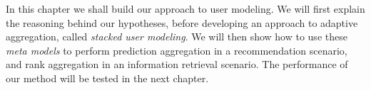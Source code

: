 In this chapter we shall build our approach to user modeling.
We will first explain the reasoning behind our hypotheses,
before developing an approach to adaptive aggregation,
called \emph{stacked user modeling}.
We will then show how to use these \emph{meta models}
to perform prediction aggregation in a recommendation scenario,
and rank aggregation in an information retrieval scenario.
The performance of our method will be tested in the next chapter.






